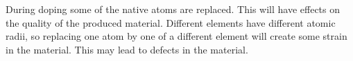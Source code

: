 During doping some of the native atoms are replaced. This will have effects on the quality of the produced material. Different elements have different atomic radii, so replacing one atom by one of a different element will create some strain in the material. This may lead to defects in the material. 





































